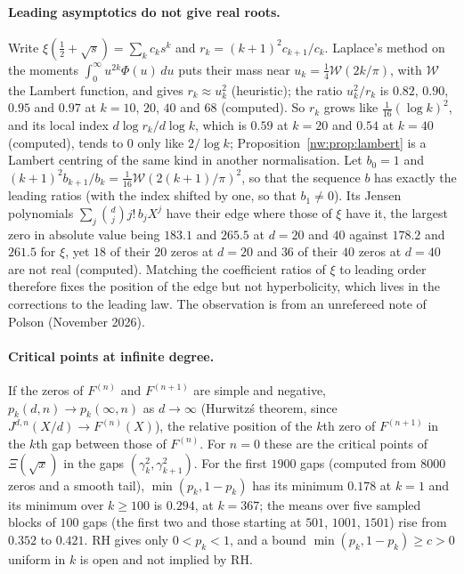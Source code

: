\paragraph{Leading asymptotics do not give real roots.} Write $\xi(\frac12+\sqrt s)=\sum_kc_ks^k$ and $r_k=(k+1)^2c_{k+1}/c_k$. Laplace's method on the moments $\int_0^\infty u^{2k}\Phi(u)\,du$ puts their mass near $u_k=\frac14\mathcal W(2k/\pi)$, with $\mathcal W$ the Lambert function, and gives $r_k\approx u_k^2$ (heuristic); the ratio $u_k^2/r_k$ is $0.82$, $0.90$, $0.95$ and $0.97$ at $k=10$, $20$, $40$ and $68$ (computed). So $r_k$ grows like $\frac1{16}(\log k)^2$, and its local index $d\log r_k/d\log k$, which is $0.59$ at $k=20$ and $0.54$ at $k=40$ (computed), tends to $0$ only like $2/\log k$; Proposition~\ref{nw:prop:lambert} is a Lambert centring of the same kind in another normalisation. Let $b_0=1$ and $(k+1)^2b_{k+1}/b_k=\frac1{16}\mathcal W(2(k+1)/\pi)^2$, so that the sequence $b$ has exactly the leading ratios (with the index shifted by one, so that $b_1\ne0$). Its Jensen polynomials $\sum_j\binom dj j!\,b_jX^j$ have their edge where those of $\xi$ have it, the largest zero in absolute value being $183.1$ and $265.5$ at $d=20$ and $40$ against $178.2$ and $261.5$ for $\xi$, yet $18$ of their $20$ zeros at $d=20$ and $36$ of their $40$ zeros at $d=40$ are not real (computed). Matching the coefficient ratios of $\xi$ to leading order therefore fixes the position of the edge but not hyperbolicity, which lives in the corrections to the leading law. The observation is from an unrefereed note of Polson (November 2026).

\paragraph{Critical points at infinite degree.} If the zeros of $F^{(n)}$ and $F^{(n+1)}$ are simple and negative, $p_k(d,n)\to p_k(\infty,n)$ as $d\to\infty$ (Hurwitz\'s theorem, since $J^{d,n}(X/d)\to F^{(n)}(X)$), the relative position of the $k$th zero of $F^{(n+1)}$ in the $k$th gap between those of $F^{(n)}$. For $n=0$ these are the critical points of $\Xi(\sqrt x)$ in the gaps $(\gamma_k^2,\gamma_{k+1}^2)$. For the first $1900$ gaps (computed from $8000$ zeros and a smooth tail), $\min(p_k,1-p_k)$ has its minimum $0.178$ at $k=1$ and its minimum over $k\ge100$ is $0.294$, at $k=367$; the means over five sampled blocks of $100$ gaps (the first two and those starting at $501$, $1001$, $1501$) rise from $0.352$ to $0.421$. RH gives only $0<p_k<1$, and a bound $\min(p_k,1-p_k)\ge c>0$ uniform in $k$ is open and not implied by RH.

